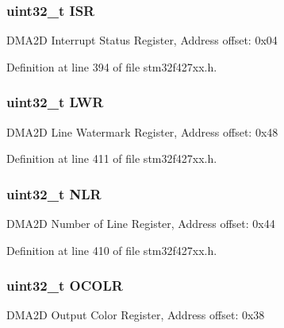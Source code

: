 \subsubsection[{\texorpdfstring{I\+SR}{ISR}}]{ uint32\+\_\+t I\+SR}\hypertarget{struct_d_m_a2_d___type_def_ab3c49a96815fcbee63d95e1e74f20e75}{}\label{struct_d_m_a2_d___type_def_ab3c49a96815fcbee63d95e1e74f20e75}
D\+M\+A2D Interrupt Status Register, Address offset\+: 0x04 

Definition at line 394 of file stm32f427xx.\+h.

\subsubsection[{\texorpdfstring{L\+WR}{LWR}}]{ uint32\+\_\+t L\+WR}\hypertarget{struct_d_m_a2_d___type_def_a2fc2e30027d62fbf2ad32f911fbadeca}{}\label{struct_d_m_a2_d___type_def_a2fc2e30027d62fbf2ad32f911fbadeca}
D\+M\+A2D Line Watermark Register, Address offset\+: 0x48 

Definition at line 411 of file stm32f427xx.\+h.

\subsubsection[{\texorpdfstring{N\+LR}{NLR}}]{ uint32\+\_\+t N\+LR}\hypertarget{struct_d_m_a2_d___type_def_a1eef24a1df459c6e5dd17d516013c5fb}{}\label{struct_d_m_a2_d___type_def_a1eef24a1df459c6e5dd17d516013c5fb}
D\+M\+A2D Number of Line Register, Address offset\+: 0x44 

Definition at line 410 of file stm32f427xx.\+h.

\subsubsection[{\texorpdfstring{O\+C\+O\+LR}{OCOLR}}]{ uint32\+\_\+t O\+C\+O\+LR}\hypertarget{struct_d_m_a2_d___type_def_a5ec0a83694c97af7786583ef37fb795c}{}\label{struct_d_m_a2_d___type_def_a5ec0a83694c97af7786583ef37fb795c}
D\+M\+A2D Output Color Register, Address offset\+: 0x38 

